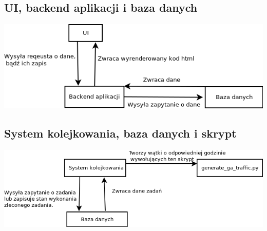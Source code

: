 \documentclass{article}
\begin{document}
\subsection{UI, backend aplikacji i baza danych}
\begin{center}\includegraphics[scale=0.5]{ui_b}\end{center}

\subsection{System kolejkowania, baza danych i skrypt}
\begin{center}\includegraphics[scale=0.5]{system}\end{center}
\end{document}
